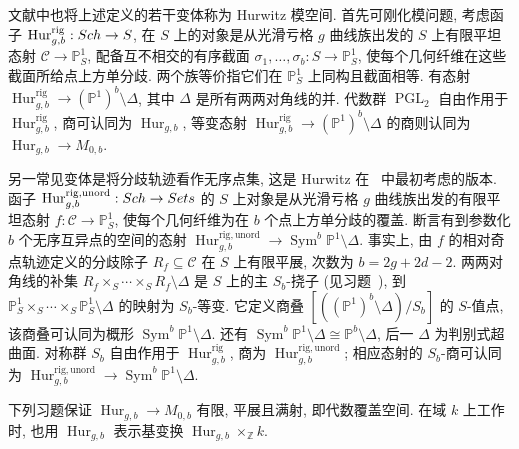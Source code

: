 \begin{remark}[变体]\label{src:6.7.12}
文献中也将上述定义的若干变体称为 Hurwitz 模空间. 首先可刚化模问题, 考虑函子 $\operatorname{Hur}_{g,\allowbreak b}^{\mathrm{rig}}:Sch\to\allowbreak S$, 在 $S$ 上的对象是从光滑亏格 $g$ 曲线族出发的 $S$ 上有限平坦态射 $\mathcal C\to\mathbb P^1_S$, 配备互不相交的有序截面 $\sigma_1,\allowbreak \ldots,\allowbreak \sigma_b:S\to\mathbb P^1_S$, 使每个几何纤维在这些截面所给点上方单分歧. 两个族等价指它们在 $\mathbb P^1_S$ 上同构且截面相等. 有态射 $\operatorname{Hur}_{g,\allowbreak b}^{\mathrm{rig}}\to(\mathbb P^1)^b\setminus\Delta$, 其中 $\Delta$ 是所有两两对角线的并. 代数群 $\operatorname{PGL}_2$ 自由作用于 $\operatorname{Hur}_{g,\allowbreak b}^{\mathrm{rig}}$, 商可认同为 $\operatorname{Hur}_{g,\allowbreak b}$, 等变态射 $\operatorname{Hur}_{g,\allowbreak b}^{\mathrm{rig}}\to(\mathbb P^1)^b\setminus\Delta$ 的商则认同为 $\operatorname{Hur}_{g,\allowbreak b}\to\allowbreak M_{0,\allowbreak b}$.

另一常见变体是将分歧轨迹看作无序点集, 这是 Hurwitz 在~\cite{Hur91} 中最初考虑的版本. 函子 $\operatorname{Hur}_{g,\allowbreak b}^{\mathrm{rig,\allowbreak unord}}:Sch\to Sets$ 的 $S$ 上对象是从光滑亏格 $g$ 曲线族出发的有限平坦态射 $f:\mathcal C\to\mathbb P^1_S$, 使每个几何纤维为在 $b$ 个点上方单分歧的覆盖. 断言有到参数化 $b$ 个无序互异点的空间的态射 $\operatorname{Hur}_{g,\allowbreak b}^{\mathrm{rig,\allowbreak unord}}\to\operatorname{Sym}^b\mathbb P^1\setminus\Delta$. 事实上, 由 $f$ 的相对奇点轨迹定义的分歧除子 $R_f\subseteq\mathcal C$ 在 $S$ 上有限平展, 次数为 $b=2g+2d-2$. 两两对角线的补集 $R_f\times_S\cdots\times_S R_f\setminus\Delta$ 是 $S$ 上的主 $S_b$-挠子 (见习题~), 到 $\mathbb P^1_S\times_S\cdots\times_S\mathbb P^1_S\setminus\Delta$ 的映射为 $S_b$-等变. 它定义商叠 $[((\mathbb P^1)^b\setminus\Delta)/S_b]$ 的 $S$-值点, 该商叠可认同为概形 $\operatorname{Sym}^b\mathbb P^1\setminus\Delta$. 还有 $\operatorname{Sym}^b\mathbb P^1\setminus\Delta\cong\mathbb P^b\setminus\Delta$, 后一 $\Delta$ 为判别式超曲面. 对称群 $S_b$ 自由作用于 $\operatorname{Hur}_{g,\allowbreak b}^{\mathrm{rig}}$, 商为 $\operatorname{Hur}_{g,\allowbreak b}^{\mathrm{rig,\allowbreak unord}}$; 相应态射的 $S_b$-商可认同为 $\operatorname{Hur}_{g,\allowbreak b}^{\mathrm{rig,\allowbreak unord}}\to\operatorname{Sym}^b\mathbb P^1\setminus\Delta$.
\end{remark}
下列习题保证 $\operatorname{Hur}_{g,\allowbreak b}\to\allowbreak M_{0,\allowbreak b}$ 有限, 平展且满射, 即代数覆盖空间. 在域 $k$ 上工作时, 也用 $\operatorname{Hur}_{g,\allowbreak b}$ 表示基变换 $\operatorname{Hur}_{g,\allowbreak b}\times_{\mathbb Z}k$.

